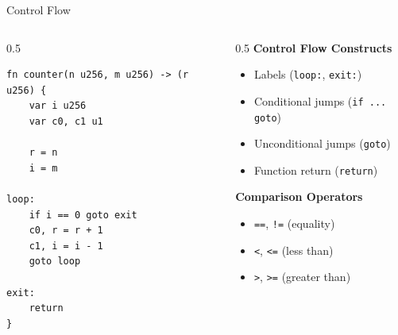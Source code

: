 \documentclass[aspectratio=169,11pt]{beamer}
\begin{document}
\begin{frame}[fragile]{Control Flow}

\begin{columns}
\begin{column}{0.5\textwidth}
\begin{lstlisting}[style=zkasm]
fn counter(n u256, m u256) -> (r u256) {
    var i u256
    var c0, c1 u1

    r = n
    i = m

loop:
    if i == 0 goto exit
    c0, r = r + 1
    c1, i = i - 1
    goto loop

exit:
    return
}
\end{lstlisting}
\end{column}

\begin{column}{0.5\textwidth}
\textbf{Control Flow Constructs}
\begin{itemize}
    \item Labels (\texttt{loop:}, \texttt{exit:})
    \item Conditional jumps (\texttt{if ... goto})
    \item Unconditional jumps (\texttt{goto})
    \item Function return (\texttt{return})
\end{itemize}

\vspace{0.5em}
\textbf{Comparison Operators}
\begin{itemize}
    \item \texttt{==}, \texttt{!=} (equality)
    \item \texttt{<}, \texttt{<=} (less than)
    \item \texttt{>}, \texttt{>=} (greater than)
\end{itemize}
\end{column}
\end{columns}
\end{frame}
\end{document}
